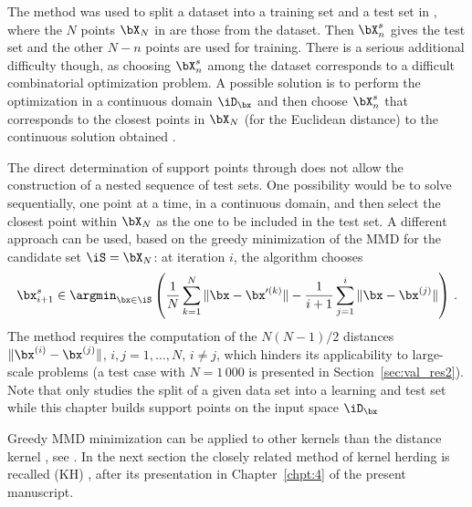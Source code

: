 The method was used to split a dataset into a training set and a test set in \citet{josvak21}, where the $N$ points $\bX_N$ in  are those from the dataset.
Then $\bX_n^s$ gives the test set and the other $N-n$ points are used for training. 
There is a serious additional difficulty though, as choosing $\bX_n^s$ among the dataset corresponds to a difficult combinatorial optimization problem. 
A possible solution is to perform the optimization in a continuous domain $\iD_\bx$ and then choose $\bX_n^s$ that corresponds to the closest points in $\bX_N$ (for the Euclidean distance) to the continuous solution obtained \citep{josvak21}. 

The direct determination of support points through  does not allow the construction of a nested sequence of test sets. 
One possibility would be to solve  sequentially, one point at a time, in a continuous domain, and then select the closest point within $\bX_N$ as the one to be included in the test set. 
A different approach can be used, based on the greedy minimization of the MMD  for the candidate set $\iS=\bX_N$: at iteration $i$, the algorithm chooses
\begin{equation}\label{eq:GreedySP}
\bx_{i+1}^s \in \argmin_{\bx\in\iS} \left( \frac{1}{N} \sum_{k=1}^N \|\bx-\bx'^{(k)}\| - \frac{1}{i+1} \sum_{j=1}^{i} \|\bx-\bx^{(j)}\| \right) \,.
\end{equation}
The method requires the computation of the $N(N-1)/2$ distances $\|\bx^{(i)}-\bx^{(j)}\|$, $i,j=1,\ldots,N$, $i\neq j$, which hinders its applicability to large-scale problems (a test case with $N=1\,000$ is presented in Section~\ref{sec:val_res2}). 
Note that \citet{josvak21} only studies the split of a given data set into a learning and test set while this chapter builds support points on the input space $\iD_\bx$

Greedy MMD minimization can be applied to other kernels than the distance kernel , see \citet{teymur_gorham_2021,pronzato_2021}. 
In the next section the closely related method of kernel herding is recalled (KH) \citep{chen_welling_2010}, after its presentation in Chapter~\ref{chpt:4} of the present manuscript.

